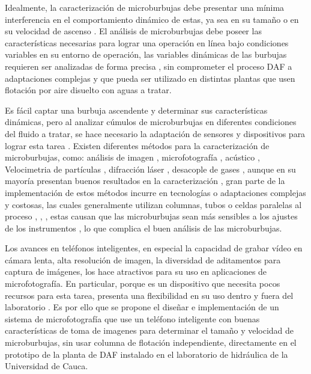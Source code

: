 \documentclass[12pt,twocolumn,a4paper]{article}
\begin{document}
Idealmente, la caracterización de microburbujas debe presentar una mínima interferencia en el comportamiento dinámico de estas, ya sea en su tamaño o en su velocidad de ascenso \cite{gulden2018online}. El análisis de microburbujas debe poseer las características necesarias para lograr una operación en línea  bajo condiciones variables en su entorno de operación, las variables dinámicas de las burbujas requieren ser analizadas de forma precisa \cite{parmar2015terminal}, sin comprometer el proceso DAF a adaptaciones complejas y que pueda ser utilizado en distintas plantas que usen flotación por aire disuelto con aguas a tratar.

Es fácil captar una burbuja ascendente y determinar sus características dinámicas, pero al  analizar cúmulos de microburbujas en diferentes condiciones del fluido a tratar, se hace necesario la adaptación de sensores y dispositivos para lograr esta tarea \cite{brasileiro2020construction}. Existen diferentes métodos para la caracterización de microburbujas, como: análisis de imagen \cite{swart2020situ}, microfotografía \cite{sadeghi2020experimental}, acústico \cite{guan2017bubble}, Velocimetria de partículas \cite{levitsky2021microbubbles}, difracción láser \cite{reis2016study}, desacople de gases \cite{parmar2015terminal}, aunque en su mayoría presentan buenos resultados en la caracterización \cite{gulden2018online} \cite{eskanlou2018interactional} \cite{aumelas2016micro}, gran parte de la implementación de estos métodos incurre en tecnologías o adaptaciones complejas y costosas, las cuales generalmente utilizan columnas, tubos o celdas paralelas al proceso \cite{reis2016study}  \cite{swart2020situ}  \cite{han2002development}, \cite{cheng2016bubble}, \cite{jeon2018bubble}, estas causan que las microburbujas sean más sensibles a los ajustes de los instrumentos \cite{jeon2018bubble}, lo que complica el buen análisis de las microburbujas.

Los avances en teléfonos inteligentes, en especial la capacidad de grabar vídeo en cámara lenta, alta resolución de imagen, la diversidad de aditamentos para captura de imágenes, los hace atractivos para su uso en aplicaciones de microfotografía. En particular, porque es un dispositivo que necesita pocos recursos para esta tarea, presenta una flexibilidad en su uso dentro y fuera del laboratorio \cite{orth2018dual}. Es por ello que se propone el diseñar e implementación de un sistema de microfotografía que use un teléfono inteligente con buenas características de toma de imagenes para determinar el tamaño y velocidad de microburbujas, sin usar columna de flotación independiente, directamente   en el prototipo de la planta de DAF instalado en el laboratorio de hidráulica de la Universidad de Cauca.
\end{document}
